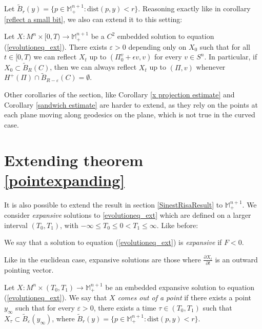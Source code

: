 Let $\tilde{B}_r(y) = \{ p \in \mathbb{M}^{n+1}_+  : \mathrm{dist}(p, y) < r \}$. Reasoning exactly like in corollary \ref{reflect a small bit}, we also can extend it to this setting:  
\begin{cor}
	Let $X:M^n\times [0,T) \rightarrow \mathbb{M}^{n+1}_+$ be a $C^2$ embedded solution to equation (\ref{evolutioneq_ext}). There exists $\varepsilon>0$ depending only on $X_0$ such that for all $t\in[0, T)$ we can reflect $X_t$ up to $(\Pi_0^v +\epsilon v, v)$ for every $v \in S^n$. In particular, if $X_0 \subset \tilde{B}_R(C)$, then we can always reflect $X_t$ up to $(\Pi, v)$ whenever $H^+(\Pi)\cap \tilde{B}_{R-\varepsilon}(C)=\emptyset$.\label{reflect a small bit ext}
\end{cor}
Other corollaries of the section, like Corollary \ref{x projection estimate} and Corollary \ref{sandwich estimate} are harder to extend, as they rely on the points at each plane moving along geodesics on the plane, which is not true in the curved case. 
\begin{comment}
{\Large \textbf{[Corollary \ref{x projection estimate} - If/when it can be done  - DA SCRIVERE]}}

{\Large \textbf{[Corollary \ref{sandwich estimate} - If/when it can be done  - DA SCRIVERE]}} I fear that this one cannot be done because the line mapping the minimum into the maximum in the reflection is not a geodesic anymore in the hyperbolic case
\end{comment}


\section{Extending theorem \ref{pointexpanding}}

It is also possible to extend the result in section \ref{SinestRisaResult} to $\mathbb{M}^{n+1}_+$. We consider {\em expansive} solutions to \ref{evolutioneq_ext} which are defined on a larger interval $(T_0, T_1)$, with  $-\infty \leq T_0 \leq 0 < T_1 \leq \infty$. Like before: 
\begin{defin}
	We say that a solution to equation (\ref{evolutioneq_ext}) is {\em expansive} if $F<0$. 
\end{defin}
Like in the euclidean case, expansive solutions are those where $\frac{\partial X_t}{\partial t}$ is an outward pointing vector. 
\begin{defin}
	Let $ X : M^n \times (T_0, T_1) \to \mathbb{M}^{n+1}_+ $ be an embedded expansive solution to equation (\ref{evolutioneq_ext}). We say that {\em $X$ comes out of a point} if there exists a point $y_\infty$ such that for every $\varepsilon>0$, there exists a time $\tau \in  (T_0, T_1)$ such that $X_\tau \subset \tilde{B}_\varepsilon(y_\infty)$, where $\tilde{B}_r(y) = \{ p \in \mathbb{M}^{n+1}_+  : \mathrm{dist}(p, y) < r \}$.
\end{defin}


